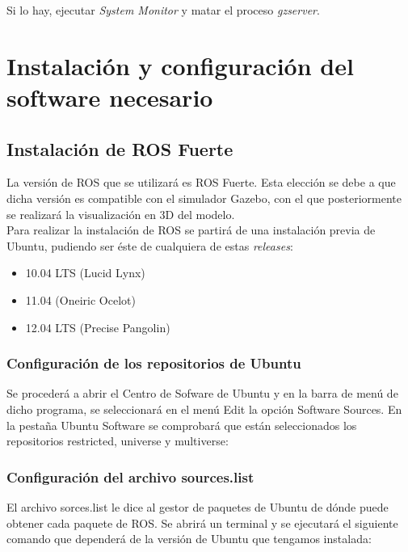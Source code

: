 \documentclass[10pt, a4paper]{report}
\begin{document}
Si lo hay, ejecutar \textit{System Monitor} y matar el proceso \textit{gzserver}.

\chapter{Instalación y configuración del software necesario}

\section{Instalación de ROS Fuerte}

La versión de ROS que se utilizará es ROS Fuerte. Esta elección se debe a que dicha versión es compatible con el simulador Gazebo, con el que posteriormente se realizará la visualización en 3D del modelo.\\

Para realizar la instalación de ROS  se partirá de una instalación previa de Ubuntu, pudiendo ser éste de cualquiera de estas \textit{releases}:

\begin{itemize}
\item 10.04 LTS (Lucid Lynx)
\item 11.04 (Oneiric Ocelot)
\item 12.04 LTS (Precise Pangolin)
\end{itemize}

\subsection{Configuración de los repositorios de Ubuntu}

Se procederá a abrir el Centro de Sofware de Ubuntu y en la barra de menú de dicho programa, se seleccionará en el menú Edit la opción Software Sources. En la pestaña Ubuntu Software se comprobará que están seleccionados los repositorios restricted, universe y multiverse:\\


\subsection{Configuración del archivo sources.list}

El archivo sorces.list le dice al gestor de paquetes de Ubuntu de dónde puede obtener cada paquete de ROS.
Se abrirá un terminal y se ejecutará el siguiente comando que dependerá de la versión de Ubuntu que tengamos instalada:\\
\end{document}
